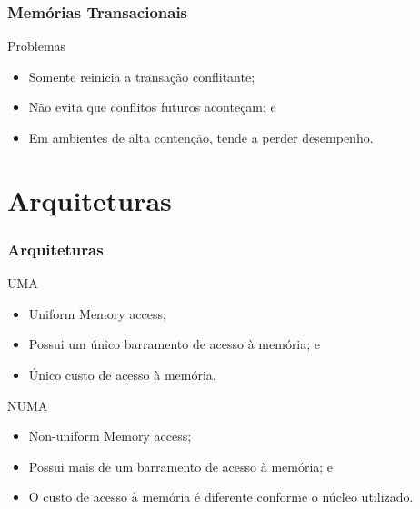 \documentclass[10pt, pdf,xcolor=pdftex,dvipsnames,table]{beamer}
\begin{document}
\begin{frame} \frametitle{Memórias Transacionais}
    \begin{alertblock}{Problemas}
        \begin{itemize}
        	\item Somente reinicia a transação conflitante;
        	\item Não evita que conflitos futuros aconteçam; e
        	\item Em ambientes de alta contenção, tende a perder desempenho.
        \end{itemize}
    \end{alertblock}
\end{frame}

\section{Arquiteturas}
\begin{frame} \frametitle{Arquiteturas}
\begin{block}{UMA}
\begin{itemize}
	\item Uniform Memory access;
	\item Possui um único barramento de acesso à memória; e
	\item Único custo de acesso à memória.
\end{itemize}
\end{block}
\begin{block}{NUMA}
\begin{itemize}
	\item Non-uniform Memory access;
	\item Possui mais de um barramento de acesso à memória; e
	\item O custo de acesso à memória é diferente conforme o núcleo utilizado.
\end{itemize}
\end{block}
\end{frame}
\end{document}
